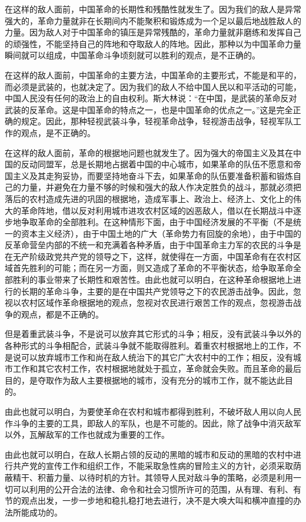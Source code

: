 在这样的敌人面前，中国革命的长期性和残酷性就发生了。因为我们的敌人是异常强大的，革命力量就非在长期间内不能聚积和锻炼成为一个足以最后地战胜敌人的力量。因为敌人对于中国革命的镇压是异常残酷的，革命力量就非磨练和发挥自己的顽强性，不能坚持自己的阵地和夺取敌人的阵地。因此，那种以为中国革命力量瞬间就可以组成，中国革命斗争顷刻就可以胜利的观点，是不正确的。

在这样的敌人面前，中国革命的主要方法，中国革命的主要形式，不能是和平的，而必须是武装的，也就决定了。因为我们的敌人不给中国人民以和平活动的可能，中国人民没有任何的政治上的自由权利。斯大林说：“在中国，是武装的革命反对武装的反革命。这是中国革命的特点之一，也是中国革命的优点之一。”这是完全正确的规定。因此，那种轻视武装斗争，轻视革命战争，轻视游击战争，轻视军队工作的观点，是不正确的。

在这样的敌人面前，革命的根据地问题也就发生了。因为强大的帝国主义及其在中国的反动同盟军，总是长期地占据着中国的中心城市，如果革命的队伍不愿意和帝国主义及其走狗妥协，而要坚持地奋斗下去，如果革命的队伍要准备积蓄和锻炼自己的力量，并避免在力量不够的时候和强大的敌人作决定胜负的战斗，那就必须把落后的农村造成先进的巩固的根据地，造成军事上、政治上、经济上、文化上的伟大的革命阵地，借以反对利用城市进攻农村区域的凶恶敌人，借以在长期战斗中逐步地争取革命的全部胜利。在这种情形下面，由于中国经济发展的不平衡（不是统一的资本主义经济），由于中国土地的广大（革命势力有回旋的余地），由于中国的反革命营垒内部的不统一和充满着各种矛盾，由于中国革命主力军的农民的斗争是在无产阶级政党共产党的领导之下，这样，就使得在一方面，中国革命有在农村区域首先胜利的可能；而在另一方面，则又造成了革命的不平衡状态，给争取革命全部胜利的事业带来了长期性和艰苦性。由此也就可以明白，在这种革命根据地上进行的长期的革命斗争，主要的是在中国共产党领导之下的农民游击战争。因此，忽视以农村区域作革命根据地的观点，忽视对农民进行艰苦工作的观点，忽视游击战争的观点，都是不正确的。

但是着重武装斗争，不是说可以放弃其它形式的斗争；相反，没有武装斗争以外的各种形式的斗争相配合，武装斗争就不能取得胜利。着重农村根据地上的工作，不是说可以放弃城市工作和尚在敌人统治下的其它广大农村中的工作；相反，没有城市工作和其它农村工作，农村根据地就处于孤立，革命就会失败。而且革命的最后目的，是夺取作为敌人主要根据地的城市，没有充分的城市工作，就不能达此目的。

由此也就可以明白，为要使革命在农村和城市都得到胜利，不破坏敌人用以向人民作斗争的主要的工具，即敌人的军队，也是不可能的。因此，除了战争中消灭敌军以外，瓦解敌军的工作也就成为重要的工作。

由此也就可以明白，在敌人长期占领的反动的黑暗的城市和反动的黑暗的农村中进行共产党的宣传工作和组织工作，不能采取急性病的冒险主义的方针，必须采取荫蔽精干、积蓄力量、以待时机的方针。其领导人民对敌斗争的策略，必须是利用一切可以利用的公开合法的法律、命令和社会习惯所许可的范围，从有理、有利、有节的观点出发，一步一步地和稳扎稳打地去进行，决不是大唤大叫和横冲直撞的办法所能成功的。

